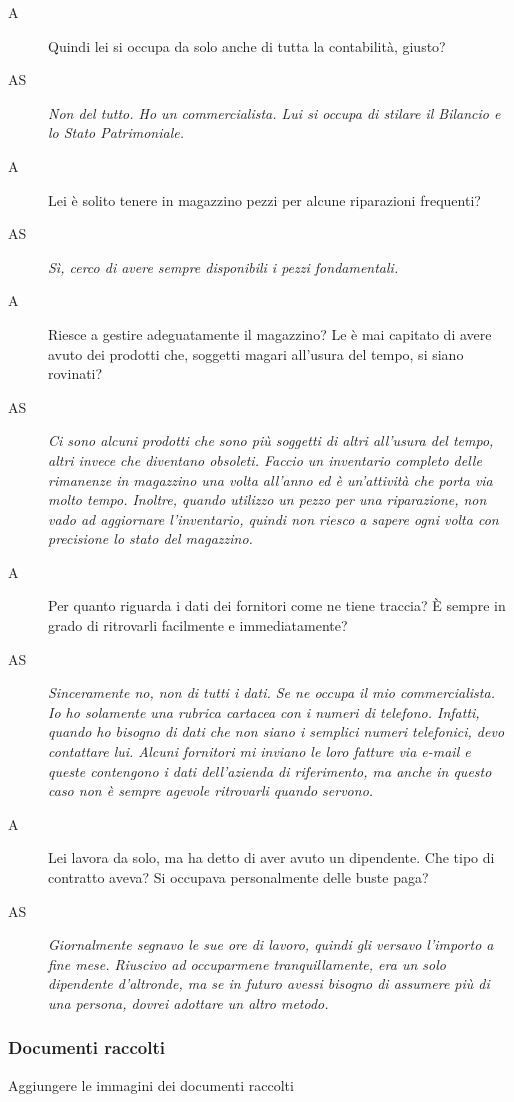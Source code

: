 \begin{description}
 			\item[A]
 				Quindi lei si occupa da solo anche di tutta la contabilità, giusto?
 			\item[AS]
 				\emph{Non del tutto. Ho un commercialista. Lui si occupa di stilare il Bilancio e lo Stato Patrimoniale.}
 			\item[A]
 				Lei è solito tenere in magazzino pezzi per alcune riparazioni frequenti?
 			\item[AS]
 				\emph{Sì, cerco di avere sempre disponibili i pezzi fondamentali.}
 			\item[A]
 				Riesce a gestire adeguatamente il magazzino? Le è mai capitato di avere avuto dei prodotti che, soggetti magari all'usura del tempo, si siano rovinati?
 			\item[AS]
 				\emph{Ci sono alcuni prodotti che sono più soggetti di altri all'usura del tempo, altri invece che diventano obsoleti. Faccio un inventario completo delle rimanenze in magazzino una volta all'anno ed è un'attività che porta via molto tempo. Inoltre, quando utilizzo un pezzo per una riparazione, non vado ad aggiornare l'inventario, quindi non riesco a sapere ogni volta con precisione lo stato del magazzino.}
 			\item[A]
 				Per quanto riguarda i dati dei fornitori come ne tiene traccia? È sempre in grado di ritrovarli facilmente e immediatamente?
 			\item[AS]
 				\emph{Sinceramente no, non di tutti i dati. Se ne occupa il mio commercialista. Io ho solamente una rubrica cartacea con i numeri di telefono. Infatti, quando ho bisogno di dati che non siano i semplici numeri telefonici, devo contattare lui. Alcuni fornitori mi inviano le loro fatture via e-mail e queste contengono i dati dell'azienda di riferimento, ma anche in questo caso non è sempre agevole ritrovarli quando servono.}
 			\item[A]
 				Lei lavora da solo, ma ha detto di aver avuto un dipendente. Che tipo di contratto aveva? Si occupava personalmente delle buste paga?
 			\item[AS]
 				\emph{Giornalmente segnavo le sue ore di lavoro, quindi gli versavo l'importo a fine mese. Riuscivo ad occuparmene tranquillamente, era un solo dipendente d'altronde, ma se in futuro avessi bisogno di assumere più di una persona, dovrei adottare un altro metodo.}
		\end{description}
				
		\subsubsection{Documenti raccolti}
			Aggiungere le immagini dei documenti raccolti
			
